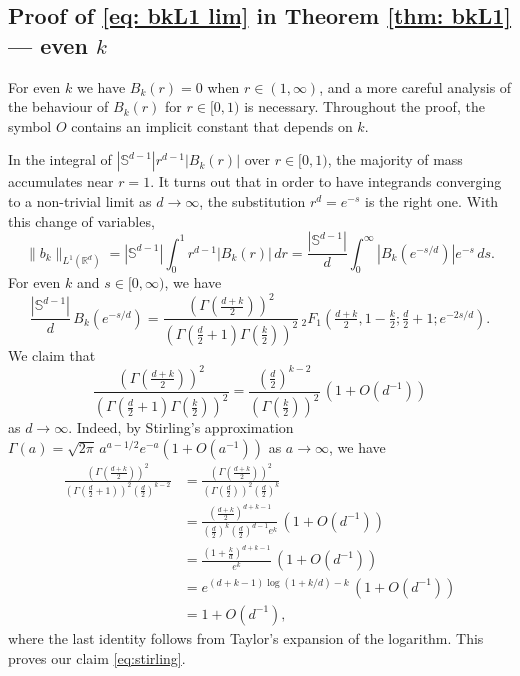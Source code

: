 \documentclass[a4paper,12pt,reqno]{amsart}
\numberwithin{equation}{section}
\theoremstyle{definition}
\newcommand{\R}{\mathbb{R}}
\newcommand{\sph}{\mathbb{S}}
\begin{document}

\subsection{Proof of \texorpdfstring{\eqref{eq: bkL1 lim}}{(\ref*{eq: bkL1 lim})} in Theorem \texorpdfstring{\ref{thm: bkL1}}{\ref*{thm: bkL1}} --- even \texorpdfstring{$k$}{k}}
For even $k$ we have $B_k(r) = 0$ when $r \in (1, \infty)$, and a more careful analysis of the behaviour of $B_k(r)$ for $r \in [0, 1)$ is necessary. Throughout the proof, the symbol $O$ contains an implicit constant that depends on $k.$

In the integral of $|\sph^{d - 1}| r^{d - 1} |B_k(r)|$ over $r \in [0, 1)$, the majority of mass accumulates near $r = 1$. It turns out that in order to have integrands converging to a non-trivial limit as $d \to \infty$, the substitution $r^d = e^{-s}$ is the right one. With this change of variables,
\[
\|b_k\|_{L^1(\R^d)}= |\sph^{d - 1}| \int_0^1 r^{d - 1} |B_k(r)| \, dr = \frac{|\sph^{d - 1}|}{d} \int_0^\infty |B_k(e^{-s / d})| e^{-s} \, ds .
\]
For even $k$ and $s \in [0, \infty)$, we have
\begin{equation}
\label{eq:kernel}
 \frac{|\sph^{d - 1}|}{d} \, B_k(e^{-s / d}) = \frac{(\Gamma(\frac{d + k}{2}))^2}{(\Gamma(\frac{d}{2} + 1) \Gamma(\frac{k}{2}))^2} \, {_2F_1}(\tfrac{d + k}{2}, 1 - \tfrac{k}{2}; \tfrac{d}{2} + 1; e^{-2 s / d}) .
\end{equation}
We claim that
\begin{equation}
\label{eq:stirling}
 \frac{(\Gamma(\frac{d + k}{2}))^2}{(\Gamma(\frac{d}{2} + 1) \Gamma(\frac{k}{2}))^2} = \frac{(\frac{d}{2})^{k - 2}}{(\Gamma(\frac{k}{2}))^2} \, (1 + O(d^{-1}))
\end{equation}
as $d \to \infty$. Indeed, by Stirling's approximation $\Gamma(a) =  \sqrt{2 \pi} \, a^{a - 1/2} e^{-a} (1 + O(a^{-1}))$ as $a \to \infty$,  we have
\begin{align*}
 \frac{(\Gamma(\frac{d + k}{2}))^2}{(\Gamma(\frac{d}{2} + 1))^2 (\frac{d}{2})^{k - 2}} & = \frac{(\Gamma(\frac{d + k}{2}))^2}{(\Gamma(\frac{d}{2}))^2 (\frac{d}{2})^k} \\
 & = \frac{(\frac{d + k}{2})^{d + k - 1}}{(\frac{d}{2})^k (\frac{d}{2})^{d - 1} e^k} \, (1 + O(d^{-1})) \\
 & = \frac{(1 + \frac{k}{d})^{d + k - 1}}{e^k} \, (1 + O(d^{-1})) \\
 & = e^{(d + k - 1) \log(1 + k/d) - k} \, (1 + O(d^{-1})) \\
 & = 1 + O(d^{-1}) ,
\end{align*}
where the last identity follows from Taylor's expansion of the logarithm.
This proves our claim \eqref{eq:stirling}.
\end{document}
